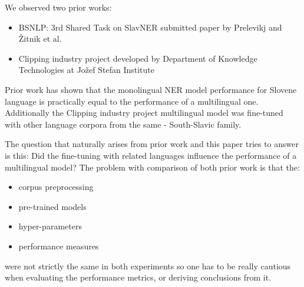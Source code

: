 \documentclass[sigconf]{acmart}
\begin{document}
We observed two prior works:
\begin{itemize}
\item BSNLP: 3rd Shared Task on SlavNER\cite{piskorski-etal-2021-slav} submitted paper by Prelevikj and Žitnik et al.\cite{prelevikj-zitnik-2021-multilingual}
\item Clipping industry project developed by Department of Knowledge Technologies at Jožef Stefan Institute\cite{KTIJS}
\end{itemize}
Prior work has shown that the monolingual NER model performance for Slovene language is practically equal to the performance of a multilingual one.
Additionally the Clipping industry project multilingual model was fine-tuned with other language corpora from the same - South-Slavic family.

The question that naturally arises from prior work and this paper tries to answer is this: Did the fine-tuning with related languages influence the performance of a multilingual model?
The problem with comparison of both prior work is that the:
\begin{itemize}
\item corpus preprocessing
\item pre-trained models
\item hyper-parameters
\item performance measures
\end{itemize}
were not strictly the same in both experiments so one has to be really cautious when evaluating the performance metrics, or deriving conclusions from it.
\end{document}
